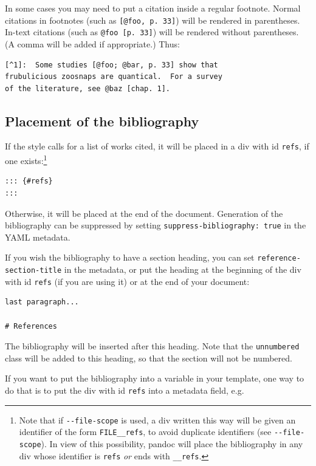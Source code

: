\documentclass[
]{article}
\begin{document}
In some cases you may need to put a citation inside a regular footnote.
Normal citations in footnotes (such as \texttt{{[}@foo,\ p.\ 33{]}})
will be rendered in parentheses. In-text citations (such as
\texttt{@foo\ {[}p.\ 33{]}}) will be rendered without parentheses. (A
comma will be added if appropriate.) Thus:

\begin{verbatim}
[^1]:  Some studies [@foo; @bar, p. 33] show that
frubulicious zoosnaps are quantical.  For a survey
of the literature, see @baz [chap. 1].
\end{verbatim}

\hypertarget{placement-of-the-bibliography}{%
\subsection{Placement of the
bibliography}\label{placement-of-the-bibliography}}

If the style calls for a list of works cited, it will be placed in a div
with id \texttt{refs}, if one exists:\footnote{Note that if
  \texttt{-\/-file-scope} is used, a div written this way will be given
  an identifier of the form \texttt{FILE\_\_refs}, to avoid duplicate
  identifiers (see \texttt{-\/-file-scope}). In view of this
  possibility, pandoc will place the bibliography in any div whose
  identifier is \texttt{refs} \emph{or} ends with \texttt{\_\_refs}.}

\begin{verbatim}
::: {#refs}
:::
\end{verbatim}

Otherwise, it will be placed at the end of the document. Generation of
the bibliography can be suppressed by setting
\texttt{suppress-bibliography:\ true} in the YAML metadata.

If you wish the bibliography to have a section heading, you can set
\texttt{reference-section-title} in the metadata, or put the heading at
the beginning of the div with id \texttt{refs} (if you are using it) or
at the end of your document:

\begin{verbatim}
last paragraph...

# References
\end{verbatim}

The bibliography will be inserted after this heading. Note that the
\texttt{unnumbered} class will be added to this heading, so that the
section will not be numbered.

If you want to put the bibliography into a variable in your template,
one way to do that is to put the div with id \texttt{refs} into a
metadata field, e.g.
\end{document}
